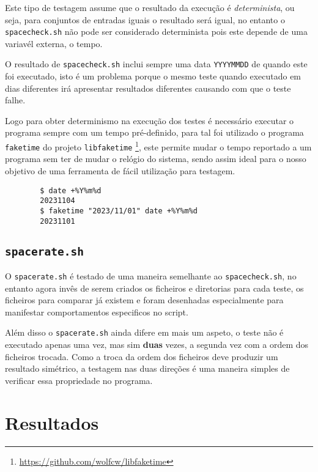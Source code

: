 Este tipo de testagem assume que o resultado da execução é \emph{determinista},
ou seja, para conjuntos de entradas iguais o resultado será igual, no entanto
o \Verb|spacecheck.sh| não pode ser considerado determinista pois este depende
de uma variavél externa, o tempo.

O resultado de \Verb|spacecheck.sh| inclui sempre uma data \Verb|YYYYMMDD| de
quando este foi executado, isto é um problema porque o mesmo teste quando
executado em dias diferentes irá apresentar resultados diferentes causando com
que o teste falhe.

Logo para obter determinismo na execução dos testes é necessário executar o
programa sempre com um tempo pré-definido, para tal foi utilizado o programa
\Verb|faketime| do projeto \Verb|libfaketime|
\footnote{\url{https://github.com/wolfcw/libfaketime}},
este permite mudar o tempo reportado a um programa sem ter de mudar o relógio
do sistema, sendo assim ideal para o nosso objetivo de uma ferramenta de fácil
utilização para testagem.

\begin{listing}[H]
	\centering
	\begin{verbatim}
		$ date +%Y%m%d
		20231104
		$ faketime "2023/11/01" date +%Y%m%d
		20231101
	\end{verbatim}
	\cprotect\caption{Exemplo do funcionamento de \Verb|faketime|.}
\end{listing}

\cprotect\subsection{\Verb|spacerate.sh|}

O \Verb|spacerate.sh| é testado de uma maneira semelhante ao
\Verb|spacecheck.sh|, no entanto agora invês de serem criados os ficheiros e
diretorias para cada teste, os ficheiros para comparar já existem e foram
desenhadas especialmente para manifestar comportamentos especificos no script.

Além disso o \Verb|spacerate.sh| ainda difere em mais um aspeto, o teste não é
executado apenas uma vez, mas sim \textbf{duas} vezes, a segunda vez com a ordem
dos ficheiros trocada. Como a troca da ordem dos ficheiros deve produzir um
resultado simétrico, a testagem nas duas direções é uma maneira simples de
verificar essa propriedade no programa.

\section{Resultados}


